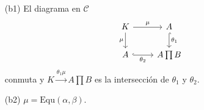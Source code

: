\documentclass[tesis]{subfiles}
\begin{document}
\begin{Prop}
\begin{enumerate}[label=(\alph*)]
            \begin{itemize}
                
                \item[(b1)] El diagrama en $\mathscr{C}$
                    \begin{equation}\label{eq: Mendoza-1.8.5-1}
                        \begin{tikzcd}
                            K \arrow[]{d}[swap]{\mu} \arrow[]{r}[]{\mu} &A \arrow[hook]{d}[]{\theta_1} \\
                            A \arrow[hook]{r}[swap]{\theta_2} &A\prod B
                        \end{tikzcd}
                    \end{equation}
                    conmuta y $K\xrightarrow{\theta_1\mu} A\prod B$ es la intersección de $\theta_1$ y $\theta_2$.

                \item[(b2)] $\mu = \text{Equ}(\alpha,\beta)$.
            \end{itemize}
    \end{enumerate}
\end{Prop}
\end{document}
